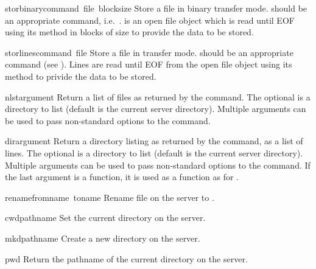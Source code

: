 \begin{funcdesc}{storbinary}{command\, file\, blocksize}
Store a file in binary transfer mode.   should be an
appropriate  command, i.e.\ .
 is an open file object which is read until EOF using its
 method in blocks of size  to provide the
data to be stored.
\end{funcdesc}

\begin{funcdesc}{storlines}{command\, file}
Store a file in \ASCII{} transfer mode.   should be an
appropriate  command (see ).  Lines are
read until EOF from the open file object  using its
 method to privide the data to be stored.
\end{funcdesc}

\begin{funcdesc}{nlst}{argument\optional{\, \ldots}}
Return a list of files as returned by the  command.  The
optional  is a directory to list (default is the current
server directory).  Multiple arguments can be used to pass
non-standard options to the  command.
\end{funcdesc}

\begin{funcdesc}{dir}{argument\optional{\, \ldots}}
Return a directory listing as returned by the  command, as
a list of lines.  The optional  is a directory to list
(default is the current server directory).  Multiple arguments can be
used to pass non-standard options to the  command.  If the
last argument is a function, it is used as a  function
as for .
\end{funcdesc}

\begin{funcdesc}{rename}{fromname\, toname}
Rename file  on the server to .
\end{funcdesc}

\begin{funcdesc}{cwd}{pathname}
Set the current directory on the server.
\end{funcdesc}

\begin{funcdesc}{mkd}{pathname}
Create a new directory on the server.
\end{funcdesc}

\begin{funcdesc}{pwd}{}
Return the pathname of the current directory on the server.
\end{funcdesc}

